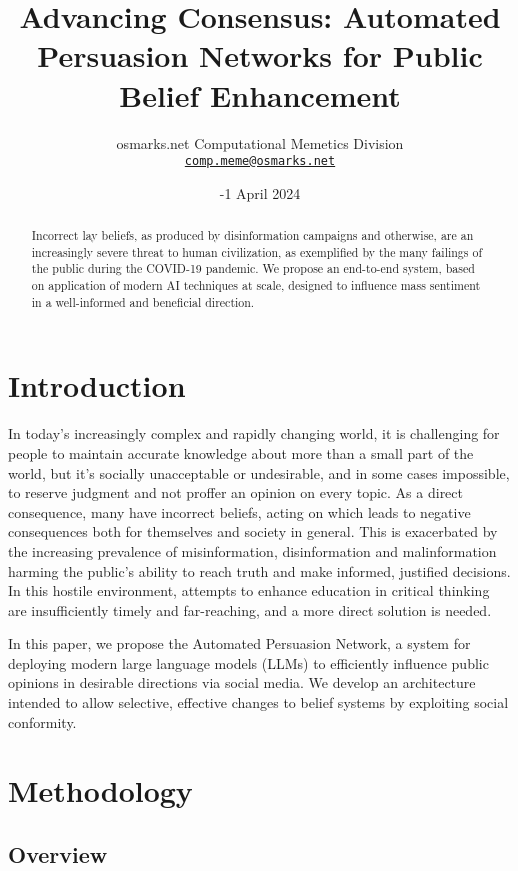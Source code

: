 \documentclass[11pt]{article}
\title{Advancing Consensus: Automated Persuasion Networks for Public Belief Enhancement}
\author{osmarks.net Computational Memetics Division \\ \texttt{\href{mailto:comp.meme@osmarks.net}{comp.meme@osmarks.net}}}
\date{-1 April 2024}
\begin{document}
\maketitle

\begin{abstract}
Incorrect lay beliefs, as produced by disinformation campaigns and otherwise, are an increasingly severe threat to human civilization, as exemplified by the many failings of the public during the COVID-19 pandemic.
We propose an end-to-end system, based on application of modern AI techniques at scale, designed to influence mass sentiment in a well-informed and beneficial direction.
\end{abstract}

\section{Introduction}

In today's increasingly complex and rapidly changing world, it is challenging for people to maintain accurate knowledge about more than a small part of the world\cite{Kilov2021}\cite{Crichton2002GellMann}, but it's socially unacceptable or undesirable, and in some cases impossible, to reserve judgment and not proffer an opinion on every topic. As a direct consequence, many have incorrect beliefs, acting on which leads to negative consequences both for themselves and society in general\cite{cicero_deoratore}. This is exacerbated by the increasing prevalence of misinformation, disinformation and malinformation\cite{MaC6453} harming the public's ability to reach truth and make informed, justified decisions. In this hostile environment, attempts to enhance education in critical thinking are insufficiently timely and far-reaching, and a more direct solution is needed.

In this paper, we propose the Automated Persuasion Network, a system for deploying modern large language models (LLMs) to efficiently influence public opinions in desirable directions via social media. We develop an architecture intended to allow selective, effective changes to belief systems by exploiting social conformity.

\section{Methodology}

\subsection{Overview}
\end{document}
